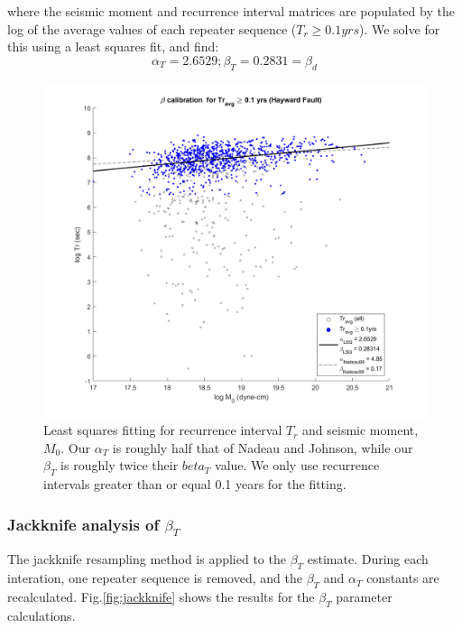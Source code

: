\documentclass{article}
\begin{document}
where the seismic moment and recurrence interval matrices are populated by the log of the average values of each repeater sequence ($T_r \geq 0.1 yrs$). We solve for this using a least squares fit, and find:
\begin{equation}
    \alpha_T = 2.6529;
    \beta_T = 0.2831 = \beta_d
    \label{eq:LSQ_const_Tr}
\end{equation}

\begin{figure}
\centering
\includegraphics[width=4.5in]{Tr_M0_comparison.png}
\caption{\label{fig:TrM0} Least squares fitting for recurrence interval $T_r$ and seismic moment, $M_0$. Our $\alpha_T$ is roughly half that of Nadeau and Johnson, while our $\beta_T$ is roughly twice their $beta_T$ value. We only use recurrence intervals greater than or equal 0.1 years for the fitting.}
\end{figure}

\subsubsection{Jackknife analysis of $\beta_T$}
The jackknife resampling method is applied to the $\beta_T$ estimate. During each interation, one repeater sequence is removed, and the $\beta_T$ and $\alpha_T$ constants are recalculated. Fig.\ref{fig:jackknife} shows the results for the $\beta_T$ parameter calculations. 
\end{document}
